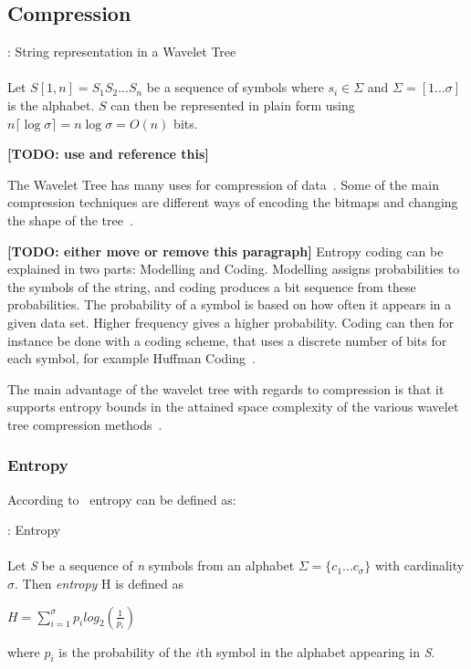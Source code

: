 \subsection{Compression}
\vspace{0.5 cm}
\begin{mdframed}[nobreak, linecolor=lightgray, linewidth=2pt]
\begin{definition}: String representation in a Wavelet Tree\\\\
Let $S[1,n] = S_1 S_2 ... S_n$ be a sequence of symbols where $s_i \in \Sigma$ and $\Sigma = [1 ... \sigma]$ is the alphabet. $S$ can then be represented in plain form using $n \lceil \log \sigma \rceil = n \log \sigma = O(n)$ bits.
\end{definition}
\textbf{[TODO: use and reference this]}
\end{mdframed}
\vspace{0.5 cm}
The Wavelet Tree has many uses for compression of data~\citep{Navjda13}. Some of the main compression techniques are different ways of encoding the bitmaps and changing the shape of the tree~\citep[Section~3]{Navjda13}.

\textbf{[TODO: either move or remove this paragraph]}
Entropy coding can be explained in two parts: Modelling and Coding.
Modelling assigns probabilities to the symbols of the string, and coding produces a bit sequence from these probabilities.
The probability of a symbol is based on how often it appears in a given data set. 
Higher frequency gives a higher probability.
Coding can then for instance be done with a coding scheme, that uses a discrete number of bits for each symbol, for example Huffman Coding~\citep{HuffmanCoding}.

The main advantage of the wavelet tree with regards to compression is that it supports entropy bounds in the attained space complexity of the various wavelet tree compression methods~\citep[Section~2.1]{WTSurvey}.

\subsubsection{Entropy}
According to~\citep[Introduction]{WTSurvey} entropy can be defined as:

\begin{mdframed}[nobreak, linecolor=lightgray, linewidth=2pt]
\begin{definition}: Entropy \\\\
Let \textit{S} be a sequence of \textit{n} symbols from an alphabet $\Sigma = \lbrace c_1 ... c_\sigma \rbrace$ with cardinality $\sigma$.
Then \textit{entropy} H is defined as
\begin{center}
$H = \sum_{i=1}^{\sigma} p_i log_2(\frac{1}{p_i})$
\end{center}
where $p_i$ is the probability of the $i$th symbol in the alphabet appearing in \textit{S}.
\end{definition} 
\end{mdframed}


